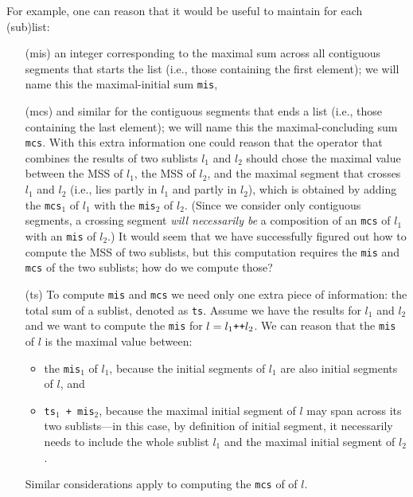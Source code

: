 \documentclass[acmsmall,review]{acmart}\settopmatter{printfolios=true,printccs=false,printacmref=false}
\begin{document}
For example, one can reason that it would be useful to maintain
for each (sub)list:
\begin{itemize}
    \item[(mis)] an integer corresponding to the maximal 
        sum across all contiguous segments that starts the 
        list (i.e., those containing the first element);
        we will name this the maximal-initial sum {\tt mis}, 
    \item[(mcs)] and similar for the contiguous segments that 
        ends a list (i.e., those containing the last element);
        we will name this the maximal-concluding sum {\tt mcs}.
        With this extra information one could reason that
        the operator that combines the results of two sublists 
        $l_1$ and $l_2$ should chose the maximal value between 
        the MSS of $l_1$, the MSS of $l_2$, and the maximal
        segment that crosses $l_1$ and $l_2$ (i.e., lies partly 
        in $l_1$ and partly in $l_2$), which is obtained
        by adding the {\tt mcs$_1$} of $l_1$ with the 
        {\tt mis$_2$} of $l_2$.
        (Since we consider only contiguous segments, a crossing 
         segment \emph{will necessarily be} a composition of an
         {\tt mcs} of $l_1$ with an {\tt mis} of $l_2$.)
        It would seem that we have successfully figured out
        how to compute the MSS of two sublists, but this
        computation requires the {\tt mis} and {\tt mcs}
        of the two sublists; how do we compute those?

    \item[(ts)] To compute {\tt mis} and {\tt mcs} we need only
        one extra piece of information: the total sum of a
        sublist, denoted as {\tt ts}. Assume we have the
        results for $l_1$ and $l_2$ and we want to compute
        the {\tt mis} for $l = l_1 \mbox{\tt++} l_2$.
        We can reason that the {\tt mis} of $l$ is the maximal
        value between:
        \begin{itemize}
            \item the {\tt mis$_1$} of $l_1$, because the initial
            segments of $l_1$ are also initial segments of $l$, and
            \item {\tt ts$_1$ + mis$_2$}, because the maximal
            initial segment of $l$ may span across its two sublists---in
            this case, by definition of initial segment, it necessarily 
            needs to include the whole sublist $l_1$ and the maximal 
            initial segment of $l_2$.
        \end{itemize}
        Similar considerations apply to computing the {\tt mcs} of
        of $l$. 
\end{itemize}
\end{document}

